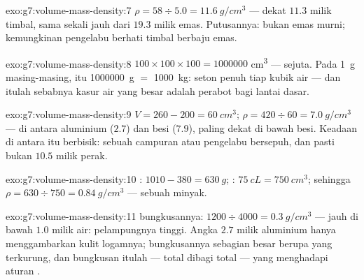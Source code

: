 \begin{solution}{exo:g7:volume-mass-density:7}
$\rho = 58 \div 5.0 = \qty{11.6}{g/cm^3}$ --- dekat $11.3$ milik
timbal, sama sekali jauh dari $19.3$ milik emas. Putusannya: bukan
emas murni; kemungkinan pengelabu berhati timbal berbaju emas.
\end{solution}

\begin{solution}{exo:g7:volume-mass-density:8}
$100 \times 100 \times 100 = 1000000$ \unit{cm^3} --- sejuta.
Pada \qty{1}{g} masing-masing, itu \qty{1000000}{g} $=$ \qty{1000}{kg}:
seton penuh tiap  kubik air --- dan itulah sebabnya kasur air
yang besar adalah perabot bagi lantai dasar.
\end{solution}

\begin{solution}{exo:g7:volume-mass-density:9}
$V = 260 - 200 = \qty{60}{cm^3}$;
$\rho = 420 \div 60 = \qty{7.0}{g/cm^3}$ --- di antara aluminium
($2.7$) dan besi ($7.9$), paling dekat di bawah besi. Keadaan di
antara itu berbisik: sebuah campuran atau pengelabu bersepuh, dan
pasti bukan $10.5$ milik perak.
\end{solution}

\begin{solution}{exo:g7:volume-mass-density:10}
 : $1010 - 380 = \qty{630}{g}$; :
$\qty{75}{cL} = \qty{750}{cm^3}$; sehingga $\rho = 630 \div 750 =
\qty{0.84}{g/cm^3}$ --- sebuah minyak.
\end{solution}

\begin{solution}{exo:g7:volume-mass-density:11}
 bungkusannya: $1200 \div 4000 = \qty{0.3}{g/cm^3}$ ---
jauh di bawah $1.0$ milik air: pelampungnya  tinggi. Angka
$2.7$ milik aluminium hanya menggambarkan kulit logamnya; bungkusannya
sebagian besar berupa  yang terkurung, dan bungkusan itulah ---
 total dibagi  total --- yang menghadapi aturan
.
\end{solution}

